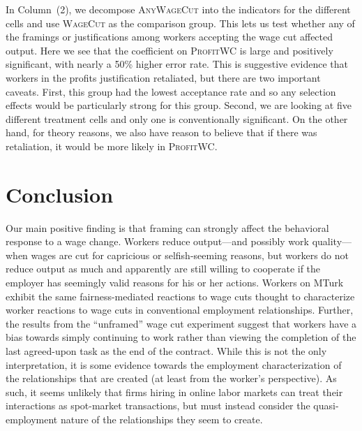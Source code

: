 \documentclass[11pt]{article}
\begin{document}
In Column~(2), we decompose \textsc{AnyWageCut} into the indicators for the different cells and use \textsc{WageCut} as the comparison group.
This lets us test whether any of the framings or justifications among workers accepting the wage cut affected output.
Here we see that the coefficient on \textsc{ProfitWC} is large and positively significant, with nearly a 50\% higher error rate.
This is suggestive evidence that workers in the profits justification retaliated, but there are two important caveats.
First, this group  had the lowest acceptance rate and so any selection effects would be particularly strong for this group.
Second, we are looking at five different treatment cells and only one is conventionally significant.
On the other hand, for theory reasons, we also have reason to believe that if there was retaliation, it would be more likely in \textsc{ProfitWC}. 

\section{Conclusion} 
Our main positive finding is that framing can strongly affect the behavioral response to a wage change.  
Workers reduce output---and possibly work quality---when wages are cut for capricious or selfish-seeming reasons, but workers do not reduce output as much and apparently are still willing to cooperate if the employer has seemingly valid reasons for his or her actions.
Workers on MTurk exhibit the same fairness-mediated reactions to wage cuts thought to characterize worker reactions to wage cuts in conventional employment relationships.
Further, the results from the ``unframed'' wage cut experiment suggest that workers have a bias towards simply continuing to work rather than viewing the completion of the last agreed-upon task as the end of the contract.
While this is not the only interpretation, it is some evidence towards the employment characterization of the relationships that are created (at least from the worker's perspective). 
As such, it seems unlikely that firms hiring in online labor markets can treat their interactions as spot-market transactions, but must instead consider the quasi-employment nature of the relationships they seem to create.
\end{document}
